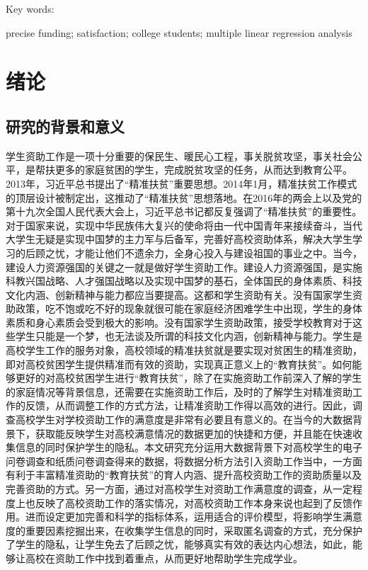 \documentclass[UTF8,a4paper,12pt]{ctexart}  %
\begin{document}
Key words:

precise funding; satisfaction; college students; multiple linear regression analysis

\hypertarget{section}{%
\section{绪论}\label{section}}

\hypertarget{section-1}{%
\subsection{研究的背景和意义}\label{section-1}}

学生资助工作是一项十分重要的保民生、暖民心工程，事关脱贫攻坚，事关社会公平，是帮扶更多的家庭贫困的学生，完成脱贫攻坚的任务，从而达到教育公平。2013年，习近平总书提出了``精准扶贫''重要思想。2014年1月，精准扶贫工作模式的顶层设计被制定出，这推动了``精准扶贫''思想落地。在2016年的两会上以及党的第十九次全国人民代表大会上，习近平总书记都反复强调了``精准扶贫''的重要性。对于国家来说，实现中华民族伟大复兴的使命将由一代中国青年来接续奋斗，当代大学生无疑是实现中国梦的主力军与后备军，完善好高校资助体系，解决大学生学习的后顾之忧，才能让他们不遗余力，全身心投入与建设祖国的事业之中。当今，建设人力资源强国的关键之一就是做好学生资助工作。建设人力资源强国，是实施科教兴国战略、人才强国战略以及实现中国梦的基石，全体国民的身体素质、科技文化内涵、创新精神与能力都应当要提高。这都和学生资助有关。没有国家学生资助政策，吃不饱或吃不好的现象就很可能在家庭经济困难学生中出现，学生的身体素质和身心素质会受到极大的影响。没有国家学生资助政策，接受学校教育对于这些学生只能是一个梦，也无法谈及所谓的科技文化内涵，创新精神与能力。学生是高校学生工作的服务对象，高校领域的精准扶贫就是要实现对贫困生的精准资助，即对高校贫困学生提供精准而有效的资助，实现真正意义上的``教育扶贫''。如何能够更好的对高校贫困学生进行``教育扶贫''，除了在实施资助工作前深入了解的学生的家庭情况等背景信息，还需要在实施资助工作后，及时的了解学生对精准资助工作的反馈，从而调整工作的方式方法，让精准资助工作得以高效的进行。因此，调查高校学生对学校资助工作的满意度是非常有必要且有意义的。在当今的大数据背景下，获取能反映学生对高校满意情况的数据更加的快捷和方便，并且能在快速收集信息的同时保护学生的隐私。本文研究充分运用大数据背景下对高校学生的电子问卷调查和纸质问卷调查得来的数据，将数据分析方法引入资助工作当中，一方面有利于丰富精准资助的``教育扶贫''的育人内涵、提升高校资助工作的资助质量以及完善资助的方式。另一方面，通过对高校学生对资助工作满意度的调查，从一定程度上也反映了高校资助工作的落实情况，对高校资助工作本身来说也起到了反馈作用。进而设定更加完善和科学的指标体系，运用适合的评价模型，将影响学生满意度的重要因素挖掘出来，在收集学生信息的同时，采取匿名调查的方式，充分保护了学生的隐私，让学生免去了后顾之忧，能够真实有效的表达内心想法，如此，能够让高校在资助工作中找到着重点，从而更好地帮助学生完成学业。
\end{document}
